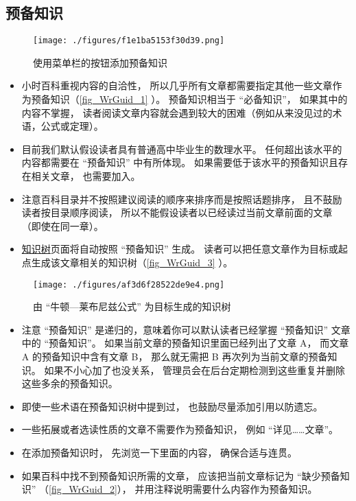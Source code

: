\subsection{预备知识}
\begin{figure}[ht]
\centering
\texttt{[image: ./figures/f1e1ba5153f30d39.png]}
\caption{使用菜单栏的按钮添加预备知识} \label{fig_WrGuid_1}
\end{figure}

\begin{itemize}
\item 小时百科重视内容的自洽性， 所以几乎所有文章都需要指定其他一些文章作为预备知识（\autoref{fig_WrGuid_1} ）。 预备知识相当于 “必备知识”， 如果其中的内容不掌握， 读者阅读文章内容就会遇到较大的困难（例如从来没见过的术语，公式或定理）。
\item 目前我们默认假设读者具有普通高中毕业生的数理水平。 任何超出该水平的内容都需要在 “预备知识” 中有所体现。 如果需要低于该水平的预备知识且存在相关文章， 也需要加入。
\item 注意百科目录并不按照建议阅读的顺序来排序而是按照话题排序， 且不鼓励读者按目录顺序阅读， 所以不能假设读者以已经读过当前文章前面的文章（即使在同一章）。
\item \href{https://wuli.wiki/tree/}{知识树}页面将自动按照 “预备知识” 生成。 读者可以把任意文章作为目标或起点生成该文章相关的知识树（\autoref{fig_WrGuid_3} ）。
\end{itemize}

\begin{figure}[ht]
\centering
\texttt{[image: ./figures/af3d6f28522de9e4.png]}
\caption{由 “牛顿—莱布尼兹公式” 为目标生成的知识树} \label{fig_WrGuid_3}
\end{figure}

\begin{itemize}
\item 注意 “预备知识” 是递归的，意味着你可以默认读者已经掌握 “预备知识” 文章中的 “预备知识”。 如果当前文章的预备知识里面已经列出了文章 A， 而文章 A 的预备知识中含有文章 B， 那么就无需把 B 再次列为当前文章的预备知识。 如果不小心加了也没关系， 管理员会在后台定期检测到这些重复并删除这些多余的预备知识。
\item 即使一些术语在预备知识树中提到过， 也鼓励尽量添加引用以防遗忘。
\item 一些拓展或者选读性质的文章不需要作为预备知识， 例如 “详见……文章”。
\item 在添加预备知识时， 先浏览一下里面的内容， 确保合适与连贯。
\item 如果百科中找不到预备知识所需的文章， 应该把当前文章标记为 “缺少预备知识” （\autoref{fig_WrGuid_2}）， 并用注释说明需要什么内容作为预备知识。
\end{itemize}

